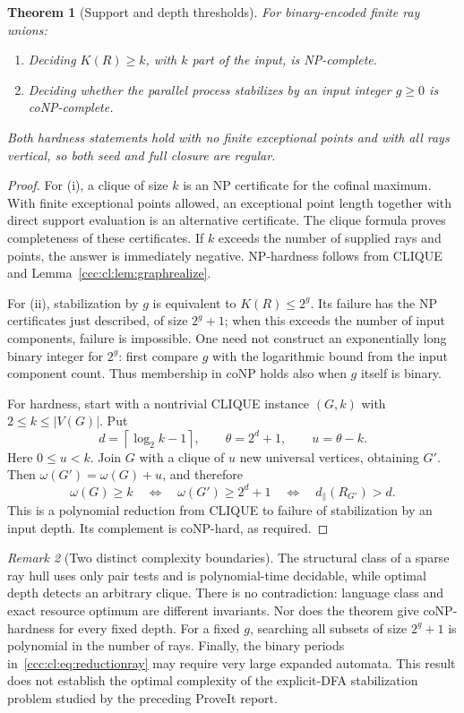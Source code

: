\documentclass[11pt,letterpaper]{article}
\newtheorem{theorem}{Theorem}[section]
\theoremstyle{definition}
\theoremstyle{remark}
\newtheorem{remark}[theorem]{Remark}
\newcommand{\clog}[1]{\left\lceil\log_2 #1\right\rceil}
\begin{document}
\begin{theorem}[Support and depth thresholds]\label{ccc:cl:thm:complexity}
For binary-encoded finite ray unions:
\begin{enumerate}[label=(\roman*)]
\item Deciding $K(R)\ge k$, with $k$ part of the input, is NP-complete.
\item Deciding whether the parallel process stabilizes by an input
integer $g\ge0$ is coNP-complete.
\end{enumerate}
Both hardness statements hold with no finite exceptional points and with
all rays vertical, so both seed and full closure are regular.
\end{theorem}
\begin{proof}
For (i), a clique of size $k$ is an NP certificate for the cofinal
maximum. With finite exceptional points allowed, an exceptional point
length together with direct support evaluation is an alternative
certificate. The clique formula proves completeness of these certificates.
If $k$ exceeds the number of supplied rays and points, the answer is
immediately negative. NP-hardness follows from CLIQUE~\cite{Karp} and
Lemma~\ref{ccc:cl:lem:graphrealize}.

For (ii), stabilization by $g$ is equivalent to $K(R)\le2^g$.
Its failure has the NP certificates just described, of size $2^g+1$;
when this exceeds the number of input components, failure is impossible.
One need not construct an exponentially long binary integer for $2^g$:
first compare $g$ with the logarithmic bound from the input component
count. Thus membership in coNP holds also when $g$ itself is binary.

For hardness, start with a nontrivial CLIQUE instance $(G,k)$ with
$2\le k\le |V(G)|$. Put
\[
 d=\clog{k-1},\qquad \theta=2^d+1,\qquad u=\theta-k.
\]
Here $0\le u<k$. Join $G$ with a clique of $u$ new universal vertices,
obtaining $G'$. Then $\omega(G')=\omega(G)+u$, and therefore
\[
 \omega(G)\ge k
 \quad\Longleftrightarrow\quad
 \omega(G')\ge2^d+1
 \quad\Longleftrightarrow\quad
 d_{\parallel}(R_{G'})>d.
\]
This is a polynomial reduction from CLIQUE to failure of stabilization
by an input depth. Its complement is coNP-hard, as required.
\end{proof}

\begin{remark}[Two distinct complexity boundaries]
The structural class of a sparse ray hull uses only pair tests and is
polynomial-time decidable, while optimal depth detects an arbitrary
clique. There is no contradiction: language class and exact resource
optimum are different invariants. Nor does the theorem give coNP-hardness
for every fixed depth. For a fixed $g$, searching all subsets of size
$2^g+1$ is polynomial in the number of rays. Finally, the binary periods
in~\eqref{ccc:cl:eq:reductionray} may require very large expanded automata. This
result does not establish the optimal complexity of the explicit-DFA
stabilization problem studied by the preceding ProveIt report.
\end{remark}
\end{document}

